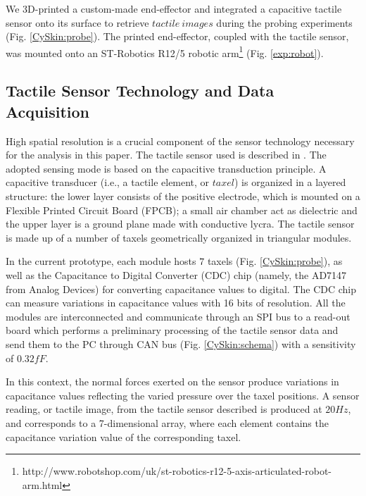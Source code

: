 We 3D-printed a custom-made end-effector and integrated a capacitive tactile sensor onto its 
surface to retrieve $tactile\ images$ during the probing experiments (Fig. \ref{CySkin:probe}). 
The printed end-effector, coupled with the tactile sensor, was mounted onto an ST-Robotics R12/5 robotic 
arm\footnote[3]{http://www.robotshop.com/uk/st-robotics-r12-5-axis-articulated-robot-arm.html}   
(Fig. \ref{exp:robot}). 

\subsection{Tactile Sensor Technology and Data Acquisition} \label{sec_skin}
High spatial resolution is a crucial component of the sensor technology necessary for the 
analysis in this paper. The tactile sensor used is described in \cite{schmitz_methods_2011}. 
The adopted sensing mode is based on the capacitive transduction principle. 
A capacitive transducer (i.e., a tactile element, or $taxel$) is organized in a 
layered structure: the lower layer consists of the positive electrode, which is mounted 
on a Flexible Printed Circuit Board (FPCB); a small air chamber act as dielectric and the 
upper layer is a ground plane made with conductive lycra. The tactile sensor is made up 
of a number of taxels geometrically organized in triangular modules. 

In the current prototype, each module hosts $7$ taxels (Fig. \ref{CySkin:probe}), as well as 
the Capacitance to Digital Converter (CDC) chip (namely, the AD7147 from Analog Devices) for 
converting capacitance values to digital. The CDC chip can measure variations in capacitance 
values with 16 bits of resolution. All the modules are interconnected and communicate through 
an SPI bus to a read-out board which performs a preliminary processing of the tactile sensor 
data and send them to the PC through CAN bus (Fig. \ref{CySkin:schema}) %
with a sensitivity of $0.32fF$. 

In this context, the normal forces exerted on the sensor produce variations in capacitance 
values reflecting the varied pressure over the taxel positions. A sensor reading, or tactile 
image, from the tactile sensor described is produced at $20Hz$, and corresponds to 
a 7-dimensional array, where each element contains the capacitance variation value of 
the corresponding taxel.


